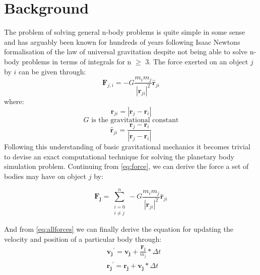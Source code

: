 \documentclass[acmtog,screen, nonacm=true]{acmart}
\begin{document}
\section{Background}
The problem of solving general n-body problems is quite simple in some sense and has arguably been known for hundreds of years following Isaac Newtons formalisation of the law of universal gravitation despite not being able to solve n-body problems in terms of integrals for n $\geq$ 3. The force exerted on an object $j$ by $i$ can be given through:
\begin{equation}
    \mathbf{F}_{j,i}=-G \frac{m_{i} m_{j}}{\left|\mathbf{r}_{ji}\right|^{2}} \hat{\mathbf{r}}_{ji}
    \label{eq:force}
\end{equation}
where: $$\mathbf{r}_{ji}=\left|\mathbf{r}_{j}-\mathbf{r}_{i}\right|$$
\vspace{1mm}
$$G \text{ is the gravitational constant}$$
\vspace{1mm}
$$\hat{\mathbf{r}}_{ji}=\frac{\mathbf{r}_{j}-\mathbf{r}_{i}}{\left|\mathbf{r}_{j}-\mathbf{r}_{i}\right|}$$
Following this understanding of basic gravitational mechanics it becomes trivial to devise an exact computational technique for solving the planetary body simulation problem. Continuing from \eqref{eq:force}, we can derive the force a set of bodies may have on object $j$ by: 

\begin{equation}
    \mathbf{F_j}=\sum_{\substack{i=0 \\ i \neq j}}^{n} -G \frac{m_{i} m_{j}}{\left|\mathbf{r}_{ji}\right|^{2}} \hat{\mathbf{r}}_{ji}
    \label{eq:allforces}
\end{equation}

And from \eqref{eq:allforces} we can finally derive the equation for updating the velocity and position of a particular body through:
\begin{equation}
    \begin{aligned}
      &\mathbf{v_{j}}^{\prime}=\mathbf{v_{j}}+\frac{\mathbf{F_j}}{m_{j}} * \Delta t \\
      &\mathbf{r_{j}}^{\prime}=\mathbf{r_{j}}+\mathbf{v_{j}} * \Delta t
    \end{aligned}
    \label{eq:posvel}
\end{equation}
\end{document}
